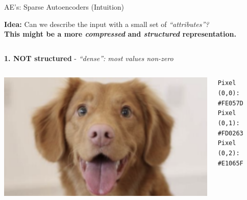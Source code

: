 \documentclass[serif, aspectratio=169]{beamer}
\begin{document}
\begin{frame}{AE’s: Sparse Autoencoders (Intuition)}
    \scriptsize
    
    \textbf{Idea:} Can we describe the input with a small set of \textit{“attributes”?}
    \\\textbf{This might be a more \textit{compressed} and \textit{structured} representation.}
    
    \begin{columns}[t]
    
        \begin{column}{0.7\textwidth}
        
             \textbf{\textcolor{deepgreen}{1. NOT structured}} - \textit{“dense”: most values non-zero}
            \begin{tcolorbox}[colback=white!10, colframe=white, boxrule=0.5pt, width=\textwidth]
                \begin{columns}[T]
                    \begin{column}{0.2\textwidth}
                        \includegraphics[width=\textwidth]{pic/SAE dog.png} 
                    \end{column}
                    \begin{column}{0.75\textwidth}
                        \scriptsize{\texttt{Pixel (0,0): \#FE057D \\
                        Pixel (0,1): \#FD0263 \\
                        Pixel (0,2): \#E1065F}} \\
                    \end{column}
                \end{columns}
            \end{tcolorbox}


\end{column}
\end{columns}
\end{frame}
\end{document}
